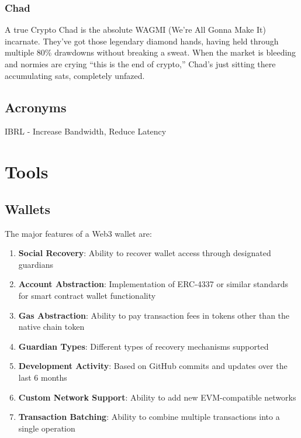 \documentclass[
  letterpaper,
  DIV=11,
  numbers=noendperiod]{scrreprt}
\providecommand{\tightlist}{%
  \setlength{\itemsep}{0pt}\setlength{\parskip}{0pt}}\usepackage{longtable,booktabs,array}
\begin{document}
\subsection{Chad}\label{chad}

A true Crypto Chad is the absolute WAGMI (We're All Gonna Make It)
incarnate. They've got those legendary diamond hands, having held
through multiple 80\% drawdowns without breaking a sweat. When the
market is bleeding and normies are crying ``this is the end of crypto,''
Chad's just sitting there accumulating sats, completely unfazed.

\section{Acronyms}\label{acronyms}

IBRL - Increase Bandwidth, Reduce Latency

\chapter{Tools}\label{tools}

\section{Wallets}\label{wallets}

The major features of a Web3 wallet are:

\begin{enumerate}
\def\labelenumi{\arabic{enumi}.}
\tightlist
\item
  \textbf{Social Recovery}: Ability to recover wallet access through
  designated guardians
\item
  \textbf{Account Abstraction}: Implementation of ERC-4337 or similar
  standards for smart contract wallet functionality
\item
  \textbf{Gas Abstraction}: Ability to pay transaction fees in tokens
  other than the native chain token
\item
  \textbf{Guardian Types}: Different types of recovery mechanisms
  supported
\item
  \textbf{Development Activity}: Based on GitHub commits and updates
  over the last 6 months
\item
  \textbf{Custom Network Support}: Ability to add new EVM-compatible
  networks
\item
  \textbf{Transaction Batching}: Ability to combine multiple
  transactions into a single operation
\end{enumerate}
\end{document}

